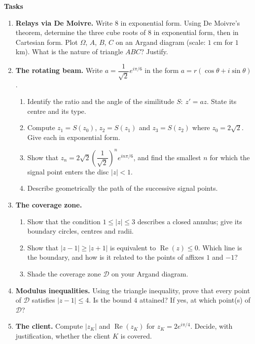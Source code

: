 \documentclass[11pt]{article}
\newcommand{\cle}[1]{{\popxbold\color{popdark}#1}}
\begin{document}
\textbf{Tasks}\par
\begin{enumerate}
\item \textbf{Relays via De Moivre.} Write $8$ in exponential form. Using De Moivre's theorem, determine the three cube roots of $8$ in exponential form, then in Cartesian form. Plot $\Omega$, $A$, $B$, $C$ on an Argand diagram (scale: $1$ cm for $1$ km). What is the nature of triangle $ABC$? Justify.

\item \textbf{The rotating beam.} Write $a = \dfrac{1}{\sqrt{2}}e^{i\pi/6}$ in the form $a = r(\cos\theta + i\sin\theta)$.
\begin{enumerate}
\item Identify the \cle{ratio} and the \cle{angle} of the similitude $S:\ z' = az$. State its centre and its type.
\item Compute $z_1 = S(z_0)$, $z_2 = S(z_1)$ and $z_3 = S(z_2)$ where $z_0 = 2\sqrt{2}$. Give each in exponential form.
\item Show that $z_n = 2\sqrt{2}\left(\dfrac{1}{\sqrt{2}}\right)^{\!n} e^{in\pi/6}$, and find the smallest $n$ for which the signal point enters the disc $|z| < 1$.
\item Describe geometrically the path of the successive signal points.
\end{enumerate}

\item \textbf{The coverage zone.}
\begin{enumerate}
\item Show that the condition $1 \le |z| \le 3$ describes a closed annulus; give its boundary circles, centres and radii.
\item Show that $|z-1| \ge |z+1|$ is equivalent to $\operatorname{Re}(z) \le 0$. Which line is the boundary, and how is it related to the points of affixes $1$ and $-1$?
\item Shade the coverage zone $\mathcal{D}$ on your Argand diagram.
\end{enumerate}

\item \textbf{Modulus inequalities.} Using the triangle inequality, prove that every point of $\mathcal{D}$ satisfies $|z - 1| \le 4$. Is the bound $4$ attained? If yes, at which point(s) of $\mathcal{D}$?

\item \textbf{The client.} Compute $|z_K|$ and $\operatorname{Re}(z_K)$ for $z_K = 2e^{i\pi/4}$. Decide, with justification, whether the client $K$ is covered.


\end{enumerate}
\end{document}
